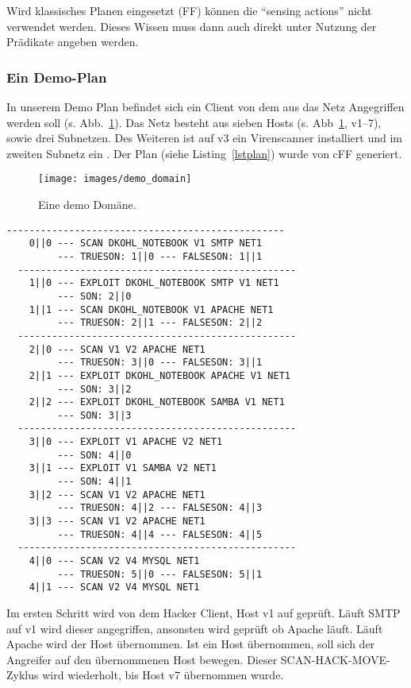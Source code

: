 Wird klassisches Planen eingesetzt (FF) können die \enquote{sensing actions}
nicht verwendet werden. Dieses Wissen muss dann auch direkt unter
Nutzung der Prädikate angeben werden.

\subsubsection{Ein Demo-Plan}

In unserem Demo Plan befindet sich ein Client von dem aus das Netz
Angegriffen werden soll (s. Abb.~\ref{fig:demo_domain}). Das Netz
besteht aus sieben Hosts (s. Abb~\ref{fig:demo_domain}, v1--7), sowie drei
Subnetzen. Des Weiteren ist auf v3 ein Virenscanner installiert und im zweiten
Subnetz ein . Der Plan (siehe Listing~\ref{lstplan}) wurde von
cFF generiert.


\begin{figure}
  \centering \texttt{[image: images/demo\_domain]}
  \caption{Eine demo Domäne.}
  \label{fig:demo_domain}
\end{figure}

\begin{lstlisting}[language={},caption={generierter Plan},label=lstplan]
  -------------------------------------------------
    0||0 --- SCAN DKOHL_NOTEBOOK V1 SMTP NET1 
         --- TRUESON: 1||0 --- FALSESON: 1||1
  -------------------------------------------------
    1||0 --- EXPLOIT DKOHL_NOTEBOOK SMTP V1 NET1 
         --- SON: 2||0
    1||1 --- SCAN DKOHL_NOTEBOOK V1 APACHE NET1
         --- TRUESON: 2||1 --- FALSESON: 2||2
  -------------------------------------------------
    2||0 --- SCAN V1 V2 APACHE NET1 
         --- TRUESON: 3||0 --- FALSESON: 3||1
    2||1 --- EXPLOIT DKOHL_NOTEBOOK APACHE V1 NET1
         --- SON: 3||2
    2||2 --- EXPLOIT DKOHL_NOTEBOOK SAMBA V1 NET1 
         --- SON: 3||3
  -------------------------------------------------
    3||0 --- EXPLOIT V1 APACHE V2 NET1 
         --- SON: 4||0
    3||1 --- EXPLOIT V1 SAMBA V2 NET1
         --- SON: 4||1
    3||2 --- SCAN V1 V2 APACHE NET1 
         --- TRUESON: 4||2 --- FALSESON: 4||3
    3||3 --- SCAN V1 V2 APACHE NET1 
         --- TRUESON: 4||4 --- FALSESON: 4||5
  -------------------------------------------------
    4||0 --- SCAN V2 V4 MYSQL NET1 
         --- TRUESON: 5||0 --- FALSESON: 5||1
    4||1 --- SCAN V2 V4 MYSQL NET1
\end{lstlisting}

Im ersten Schritt wird von dem Hacker Client, Host v1 auf 
geprüft. Läuft SMTP auf v1 wird dieser angegriffen, ansonsten wird
geprüft ob Apache läuft. Läuft Apache wird der Host übernommen. Ist
ein Host übernommen, soll sich der Angreifer auf den übernommenen Host
bewegen. Dieser SCAN-HACK-MOVE-Zyklus wird wiederholt, bis Host
v7 übernommen wurde.
		
